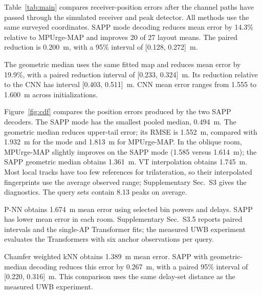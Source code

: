 Table~\ref{tab:main} compares receiver-position errors after the channel paths have passed through the simulated receiver and peak detector. All methods use the same surveyed coordinates. SAPP mode decoding reduces mean error by 14.3\% relative to MPUrge-MAP and improves 20 of 27 layout means. The paired reduction is 0.200~m, with a 95\% interval of [0.128, 0.272]~m.

The geometric median uses the same fitted map and reduces mean error by 19.9\%, with a paired reduction interval of [0.233, 0.324]~m. Its reduction relative to the CNN has interval [0.403, 0.511]~m. CNN mean error ranges from 1.555 to 1.600~m across initializations.

Figure~\ref{fig:cdf} compares the position errors produced by the two SAPP decoders. The SAPP mode has the smallest pooled median, 0.494~m. The geometric median reduces upper-tail error; its RMSE is 1.552~m, compared with 1.932~m for the mode and 1.813~m for MPUrge-MAP. In the oblique room, MPUrge-MAP slightly improves on the SAPP mode (1.585 versus 1.614~m); the SAPP geometric median obtains 1.361~m. VT interpolation obtains 1.745~m. Most local tracks have too few references for trilateration, so their interpolated fingerprints use the average observed range; Supplementary Sec.~S3 gives the diagnostics. The query sets contain 8.13 peaks on average.

P-NN obtains 1.674~m mean error using selected bin powers and delays. SAPP has lower mean error in each room. Supplementary Sec.~S3.5 reports paired intervals and the single-AP Transformer fits; the measured UWB experiment evaluates the Transformers with six anchor observations per query.

Chamfer weighted kNN obtains 1.389~m mean error. SAPP with geometric-median decoding reduces this error by 0.267~m, with a paired 95\% interval of [0.220, 0.316]~m. This comparison uses the same delay-set distance as the measured UWB experiment.
